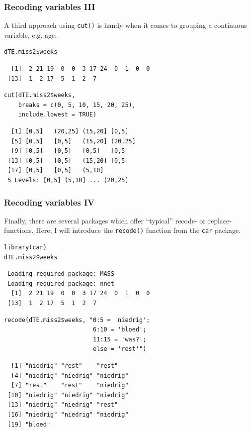 \documentclass[bigger]{beamer}
\begin{document}
\begin{frame}[fragile]
\frametitle{Recoding variables III}
\label{sec-4-1-11}

    


    A third approach using \texttt{cut()} is handy when it comes to grouping a continuous variable,
    e.g. age. 


\lstset{language=R}
\begin{lstlisting}
dTE.miss2$weeks
\end{lstlisting}

\begin{verbatim}
  [1]  2 21 19  0  0  3 17 24  0  1  0  0
 [13]  1  2 17  5  1  2  7
\end{verbatim}


\lstset{language=R}
\begin{lstlisting}
cut(dTE.miss2$weeks, 
    breaks = c(0, 5, 10, 15, 20, 25), 
    include.lowest = TRUE)
\end{lstlisting}

\begin{verbatim}
  [1] [0,5]   (20,25] (15,20] [0,5]  
  [5] [0,5]   [0,5]   (15,20] (20,25]
  [9] [0,5]   [0,5]   [0,5]   [0,5]  
 [13] [0,5]   [0,5]   (15,20] [0,5]  
 [17] [0,5]   [0,5]   (5,10] 
 5 Levels: [0,5] (5,10] ... (20,25]
\end{verbatim}
\end{frame}
\begin{frame}[fragile,shrink = 5 ]
\frametitle{Recoding variables IV}
\label{sec-4-1-12}



    Finally, there are several packages which offer \enquote{typical} recode- or
    replace-functions. Here, I will introduce the \texttt{recode()} function from the
    \texttt{car} package. 


\lstset{language=R}
\begin{lstlisting}
library(car)
dTE.miss2$weeks
\end{lstlisting}

\begin{verbatim}
 Loading required package: MASS
 Loading required package: nnet
  [1]  2 21 19  0  0  3 17 24  0  1  0  0
 [13]  1  2 17  5  1  2  7
\end{verbatim}


\lstset{language=R}
\begin{lstlisting}
recode(dTE.miss2$weeks, "0:5 = 'niedrig'; 
                         6:10 = 'bloed'; 
                         11:15 = 'was?';
                         else = 'rest'")
\end{lstlisting}

\begin{verbatim}
  [1] "niedrig" "rest"    "rest"   
  [4] "niedrig" "niedrig" "niedrig"
  [7] "rest"    "rest"    "niedrig"
 [10] "niedrig" "niedrig" "niedrig"
 [13] "niedrig" "niedrig" "rest"   
 [16] "niedrig" "niedrig" "niedrig"
 [19] "bloed"
\end{verbatim}
\end{frame}
\end{document}
